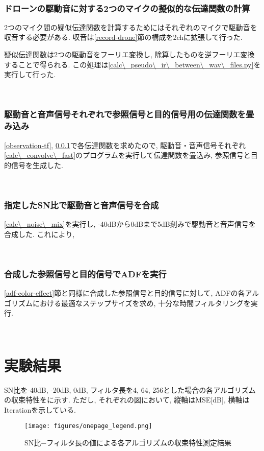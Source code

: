 \
\subsubsection{ドローンの駆動音に対する2つのマイクの擬似的な伝達関数の計算}\label{pseudo-tf}

2つのマイク間の疑似伝達関数を計算するためにはそれぞれのマイクで駆動音を収音する必要がある. 収音は\ref{record-drone}節の構成を2chに拡張して行った. 

疑似伝達関数は2つの駆動音をフーリエ変換し, 除算したものを逆フーリエ変換することで得られる. この処理は\ref{calc\_pseudo\_ir\_between\_wav\_files.py}を実行して行った. 

\
\subsubsection{駆動音と音声信号それぞれで参照信号と目的信号用の伝達関数を畳み込み}\label{convolve-each}

\ref{observation-tf}, \ref{pseudo-tf}で各伝達関数を求めたので, 駆動音・音声信号それぞれ\ref{calc\_convolve\_fast}のプログラムを実行して伝達関数を畳込み, 参照信号と目的信号を生成した. 

\
\subsubsection{指定したSN比で駆動音と音声信号を合成}\label{mix-snr}

\ref{calc\_noise\_mix}を実行し, -40dBから0dBまで5dB刻みで駆動音と音声信号を合成した. これにより, 

\
\subsubsection{合成した参照信号と目的信号でADFを実行}\label{exec-adf}

\ref{adf-color-effect}節と同様に合成した参照信号と目的信号に対して, ADFの各アルゴリズムにおける最適なステップサイズを求め, 十分な時間フィルタリングを実行. 

\
\section{実験結果}\label{result-practice}

SN比を-40dB, -20dB, 0dB, フィルタ長を4, 64, 256とした場合の各アルゴリズムの収束特性を\figref{fig:onepage}に示す. ただし, それぞれの図において, 縦軸はMSE{[}dB{]}, 横軸はIterationを示している. 

\begin{figure}[H]
\centering
\texttt{[image: figures/onepage\_legend.png]}
\label{fig:onepage}
\caption{SN比−フィルタ長の値による各アルゴリズムの収束特性測定結果}
\end{figure}


